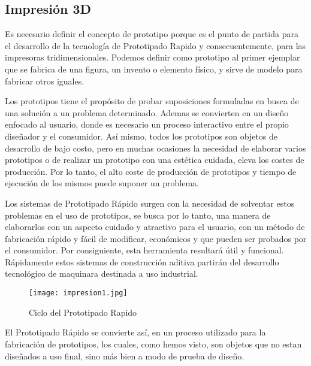 \subsection{Impresión 3D}

\par
Es necesario definir el concepto de prototipo porque es el punto de partida para el desarrollo de la tecnología de Prototipado Rapido y consecuentemente, para las impresoras tridimensionales. Podemos definir como prototipo al primer ejemplar que se fabrica de una figura, un invento o elemento físico, y sirve de modelo para fabricar otros iguales.  

\par \noindent
Los prototipos tiene el propósito de probar suposiciones formuladas en busca de una solución a un problema determinado. Ademas se convierten en un diseño enfocado al usuario, donde es necesario un proceso interactivo entre el propio diseñador y el consumidor. Así mismo, todos los prototipos son objetos de desarrollo de bajo costo, pero en muchas ocasiones la necesidad de elaborar varios prototipos o de realizar un prototipo con una estética cuidada, eleva los costes de producción. Por lo tanto, el alto coste de producción de prototipos y tiempo de ejecución de los mismos puede suponer un problema.

\par \noindent
Los sistemas de Prototipado Rápido surgen con la necesidad de solventar estos problemas en el uso de prototipos, se busca por lo tanto, una manera de elaborarlos con un aspecto cuidado y atractivo para el usuario, con un método de fabricación rápido y fácil de modificar, económicos y que pueden ser probados por el consumidor. Por consiguiente, esta herramienta resultará útil y funcional. Rápidamente estos sistemas de construcción aditiva partirán del desarrollo tecnológico de maquinara destinada a uso industrial\cite{impresoras3d-valverde}. 

\begin{figure}[H]
	\centering
	\texttt{[image: impresion1.jpg]}
	\caption{Ciclo del Prototipado Rapido}
\end{figure}

\par \noindent
El Prototipado Rápido se convierte así, en un proceso utilizado para la fabricación de prototipos, los cuales, como hemos visto, son objetos que no estan diseñados a uso final, sino más bien a modo de prueba de diseño\cite{impresoras3d-valverde}.

